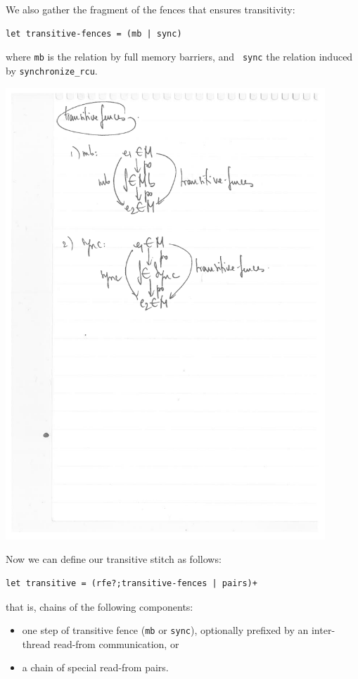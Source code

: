 \documentclass[a4paper]{article}
\begin{document}
We also gather the fragment of the fences that ensures transitivity:
\begin{verbatim}
let transitive-fences = (mb | sync)
\end{verbatim}
\noindent where {\tt mb} is the relation by full memory barriers, and {\tt
sync} the relation induced by {\tt synchronize\_rcu}. 

\includegraphics[width=12cm]{transitive-fences}

\pagebreak

Now we can define our transitive stitch as follows:
\begin{verbatim}
let transitive = (rfe?;transitive-fences | pairs)+
\end{verbatim}
\noindent that is, chains of the following components:
\begin{itemize}
\item one step of transitive fence ({\tt mb} or {\tt sync}), optionally
prefixed by an inter-thread read-from communication, or 
\item a chain of special read-from pairs. 
\end{itemize}
\end{document}
